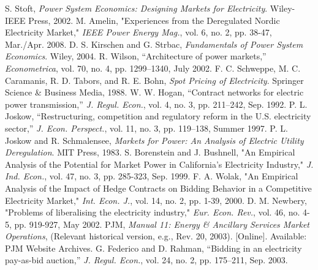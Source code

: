 \documentclass[conference]{IEEEtran}
\begin{document}
\begin{thebibliography}{99}
 S. Stoft, \textit{Power System Economics: Designing Markets for Electricity}. Wiley-IEEE Press, 2002. %
 M. Amelin, "Experiences from the Deregulated Nordic Electricity Market," \textit{IEEE Power Energy Mag.}, vol. 6, no. 2, pp. 38-47, Mar./Apr. 2008. %
 D. S. Kirschen and G. Strbac, \textit{Fundamentals of Power System Economics}. Wiley, 2004. %
 R. Wilson, “Architecture of power markets,” \textit{Econometrica}, vol. 70, no. 4, pp. 1299–1340, July 2002. %
 F. C. Schweppe, M. C. Caramanis, R. D. Tabors, and R. E. Bohn, \textit{Spot Pricing of Electricity}. Springer Science & Business Media, 1988. %
 W. W. Hogan, “Contract networks for electric power transmission,” \textit{J. Regul. Econ.}, vol. 4, no. 3, pp. 211–242, Sep. 1992. %
 P. L. Joskow, “Restructuring, competition and regulatory reform in the U.S. electricity sector,” \textit{J. Econ. Perspect.}, vol. 11, no. 3, pp. 119–138, Summer 1997. %
 P. L. Joskow and R. Schmalensee, \textit{Markets for Power: An Analysis of Electric Utility Deregulation}. MIT Press, 1983. %
 S. Borenstein and J. Bushnell, "An Empirical Analysis of the Potential for Market Power in California's Electricity Industry," \textit{J. Ind. Econ.}, vol. 47, no. 3, pp. 285-323, Sep. 1999. %
 F. A. Wolak, "An Empirical Analysis of the Impact of Hedge Contracts on Bidding Behavior in a Competitive Electricity Market," \textit{Int. Econ. J.}, vol. 14, no. 2, pp. 1-39, 2000. %
 D. M. Newbery, "Problems of liberalising the electricity industry," \textit{Eur. Econ. Rev.}, vol. 46, no. 4-5, pp. 919-927, May 2002. %
 PJM, \textit{Manual 11: Energy \& Ancillary Services Market Operations}, (Relevant historical version, e.g., Rev. 20, 2003). [Online]. Available: PJM Website Archives. %
 G. Federico and D. Rahman, “Bidding in an electricity pay-as-bid auction,” \textit{J. Regul. Econ.}, vol. 24, no. 2, pp. 175–211, Sep. 2003. %

\end{thebibliography}
\end{document}
